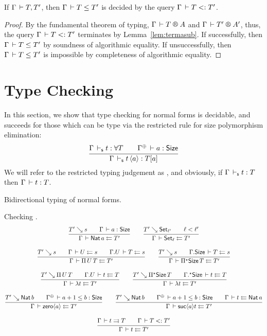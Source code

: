 \documentclass[acmlarge,review,anonymous]{acmart}\settopmatter{printfolios=true}
\begin{document}
\begin{theorem}
  If $\Gamma \,\vdash T,T'$, then $\Gamma \,\vdash T \leq T'$ is decided by the query $\Gamma \,\vdash T \mathrel{{<}{:}} T'$.
\end{theorem}
\begin{proof}
  By the fundamental theorem of typing, $\RG \Gamma T A$ and $\RG \Gamma {T'} {A'}$,
  thus, the query  $\Gamma \,\vdash T \mathrel{{<}{:}} T'$ terminates by Lemma~\ref{lem:termasub}.
  If successfully, then $\Gamma \,\vdash T \leq T'$ by soundness of algorithmic equality.
  If unsuccessfully, then $\Gamma \,\vdash T \leq T'$ is impossible by completeness of algorithmic equality.
\end{proof}


\section{Type Checking}
\label{sec:tycheck}

In this section, we show that type checking for normal forms is decidable, and succeeds for those which can be type via the restricted rule for size polymorphism elimination:
\[
  \ru{\Gamma \ders t : \forall T \qquad
      \resurrect\Gamma \der a : \Size
    }{\Gamma \ders t\, \ann a : T[a]}
\]
We will refer to the restricted typing judgement as , and obviously,
if $\Gamma \,\vdash_\mathsf{s} t : T$ then $\Gamma \,\vdash t : T$.

Bidirectional typing of normal forms.

Checking .
\begin{gather*}
  \ru{T' \evalsto s \qquad
      \Gamma \der a : \Size
    }{\Gamma \der \Nat a \jchk T'}
\qquad
  \ru{T' \evalsto \Set[\ell'] \qquad \ell < \ell'
    }{\Gamma \der \Set[\ell] \jchk T'}
\\[2ex]
  \ru{T' \evalsto s \qquad
      \Gamma \der U \jchk s \qquad
      \cext \Gamma U \der T \jchk s
    }{\Gamma \der \piT U T \jchk T'}
\qquad
  \ru{T' \evalsto s \qquad
      \cext \Gamma \Size \der T \jchk s
    }{\Gamma \der \epiT \Size T \jchk T'}
\\[2ex]
  \ru{T' \evalsto \piT U T \qquad
      \cext \Gamma U \der t \jchk T
    }{\Gamma \der \lambda t \jchk T'}
\qquad
  \ru{T' \evalsto \epiT \Size T \qquad
      \eext \Gamma \Size \der t \jchk T
    }{\Gamma \der \lambda t \jchk T'}
\\[2ex]
  \ru{T' \evalsto \Nat b \qquad
      \resurrect \Gamma \der a+1 \leq b : \Size
    }{\Gamma \der \zero a \jchk T'}
\qquad
  \ru{T' \evalsto \Nat b \qquad
      \resurrect \Gamma \der a+1 \leq b : \Size \qquad
      \Gamma \der t \jchk \Nat a
    }{\Gamma \der \suc a t \jchk T'}
\\[2ex]
  \ru{\Gamma \der t \jinf T \qquad \Gamma \der T \asub T'
    }{\Gamma \der t \jchk T'}
\end{gather*}
\end{document}
